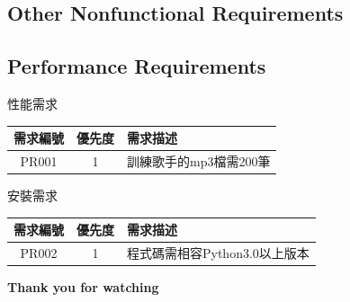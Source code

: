 \documentclass{article}
\begin{document}
\begin{CJK}{UTF8}{bkai}
\section{\huge\bf  \color {blue}  Other Nonfunctional Requirements }
\subsection{ \Large Performance Requirements}
\begin{center}
	性能需求\\
	\begin{tabular}{|c|c|p{8cm}|}\hline
		需求編號 & 優先度 & 需求描述 \\ \hline
		PR001 & 1 &訓練歌手的mp3檔需200筆  \\ \hline
	\end{tabular}
\end{center}
\begin{center}
	安裝需求\\
	\begin{tabular}{|c|c|p{8cm}|}\hline
		需求編號 & 優先度 & 需求描述 \\ \hline
		PR002 & 1 &程式碼需相容Python3.0以上版本  \\ \hline
	\end{tabular}
\end{center}
\newpage
\Huge\bf   Thank you for watching


\end{CJK}
\end{document}
